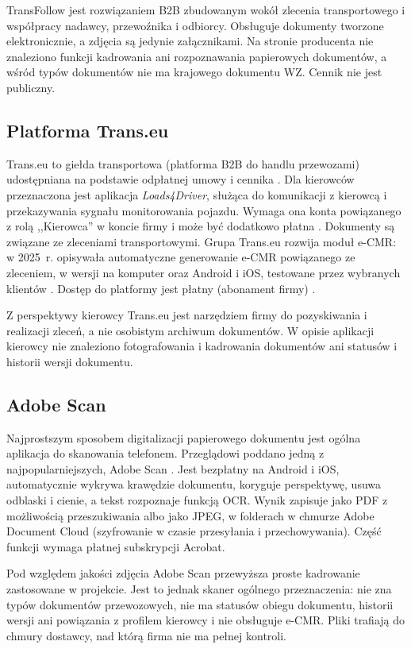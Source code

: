 TransFollow jest rozwiązaniem B2B zbudowanym wokół zlecenia transportowego
i współpracy nadawcy, przewoźnika i odbiorcy. Obsługuje dokumenty tworzone
elektronicznie, a zdjęcia są jedynie załącznikami. Na stronie producenta nie
znaleziono funkcji kadrowania ani rozpoznawania papierowych dokumentów, a wśród
typów dokumentów nie ma krajowego dokumentu WZ. Cennik nie jest publiczny.

\subsection{Platforma Trans.eu}

Trans.eu to giełda transportowa (platforma B2B do handlu przewozami)
udostępniana na podstawie odpłatnej umowy i cennika \cite{transeu_regulamin}.
Dla kierowców przeznaczona jest aplikacja \emph{Loads4Driver}, służąca do
komunikacji z kierowcą i przekazywania sygnału monitorowania pojazdu.
Wymaga ona konta powiązanego z rolą ,,Kierowca'' w koncie firmy i może być
dodatkowo płatna \cite{transeu_regulamin}. Dokumenty są związane ze zleceniami
transportowymi. Grupa Trans.eu rozwija moduł e-CMR: w 2025~r. opisywała
automatyczne generowanie e-CMR
powiązanego ze zleceniem, w wersji na komputer oraz Android i iOS, testowane
przez wybranych klientów \cite{cargoon_ecmr}. Dostęp do platformy jest płatny
(abonament firmy) \cite{transeu_regulamin}.

Z perspektywy kierowcy Trans.eu jest narzędziem firmy do pozyskiwania
i realizacji zleceń, a nie osobistym archiwum dokumentów. W opisie aplikacji
kierowcy nie znaleziono fotografowania i kadrowania dokumentów ani statusów
i historii wersji dokumentu.

\subsection{Adobe Scan}

Najprostszym sposobem digitalizacji papierowego dokumentu jest ogólna
aplikacja do skanowania telefonem. Przeglądowi poddano jedną z najpopularniejszych,
Adobe Scan \cite{adobe_scan}. Jest bezpłatny na
Android i iOS, automatycznie wykrywa krawędzie dokumentu, koryguje perspektywę,
usuwa odblaski i cienie, a tekst rozpoznaje funkcją OCR. Wynik zapisuje jako
PDF z możliwością przeszukiwania albo jako JPEG, w folderach w chmurze Adobe
Document Cloud (szyfrowanie w czasie przesyłania i przechowywania). Część
funkcji wymaga płatnej subskrypcji Acrobat.

Pod względem jakości zdjęcia Adobe Scan przewyższa proste kadrowanie
zastosowane w projekcie. Jest to jednak skaner ogólnego przeznaczenia: nie
zna typów dokumentów przewozowych, nie ma statusów obiegu dokumentu, historii
wersji ani powiązania z profilem kierowcy i nie obsługuje e-CMR. Pliki trafiają
do chmury dostawcy, nad którą firma nie ma pełnej kontroli.

